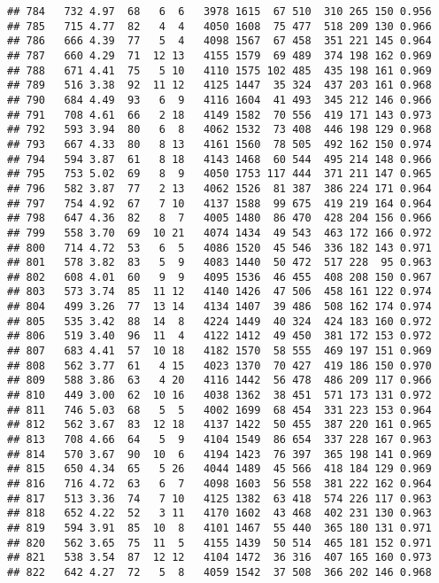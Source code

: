 \documentclass[]{article}
\begin{document}
\begin{verbatim}
## 784   732 4.97  68   6  6   3978 1615  67 510  310 265 150 0.956
## 785   715 4.77  82   4  4   4050 1608  75 477  518 209 130 0.966
## 786   666 4.39  77   5  4   4098 1567  67 458  351 221 145 0.964
## 787   660 4.29  71  12 13   4155 1579  69 489  374 198 162 0.969
## 788   671 4.41  75   5 10   4110 1575 102 485  435 198 161 0.969
## 789   516 3.38  92  11 12   4125 1447  35 324  437 203 161 0.968
## 790   684 4.49  93   6  9   4116 1604  41 493  345 212 146 0.966
## 791   708 4.61  66   2 18   4149 1582  70 556  419 171 143 0.973
## 792   593 3.94  80   6  8   4062 1532  73 408  446 198 129 0.968
## 793   667 4.33  80   8 13   4161 1560  78 505  492 162 150 0.974
## 794   594 3.87  61   8 18   4143 1468  60 544  495 214 148 0.966
## 795   753 5.02  69   8  9   4050 1753 117 444  371 211 147 0.965
## 796   582 3.87  77   2 13   4062 1526  81 387  386 224 171 0.964
## 797   754 4.92  67   7 10   4137 1588  99 675  419 219 164 0.964
## 798   647 4.36  82   8  7   4005 1480  86 470  428 204 156 0.966
## 799   558 3.70  69  10 21   4074 1434  49 543  463 172 166 0.972
## 800   714 4.72  53   6  5   4086 1520  45 546  336 182 143 0.971
## 801   578 3.82  83   5  9   4083 1440  50 472  517 228  95 0.963
## 802   608 4.01  60   9  9   4095 1536  46 455  408 208 150 0.967
## 803   573 3.74  85  11 12   4140 1426  47 506  458 161 122 0.974
## 804   499 3.26  77  13 14   4134 1407  39 486  508 162 174 0.974
## 805   535 3.42  88  14  8   4224 1449  40 324  424 183 160 0.972
## 806   519 3.40  96  11  4   4122 1412  49 450  381 172 153 0.972
## 807   683 4.41  57  10 18   4182 1570  58 555  469 197 151 0.969
## 808   562 3.77  61   4 15   4023 1370  70 427  419 186 150 0.970
## 809   588 3.86  63   4 20   4116 1442  56 478  486 209 117 0.966
## 810   449 3.00  62  10 16   4038 1362  38 451  571 173 131 0.972
## 811   746 5.03  68   5  5   4002 1699  68 454  331 223 153 0.964
## 812   562 3.67  83  12 18   4137 1422  50 455  387 220 161 0.965
## 813   708 4.66  64   5  9   4104 1549  86 654  337 228 167 0.963
## 814   570 3.67  90  10  6   4194 1423  76 397  365 198 141 0.969
## 815   650 4.34  65   5 26   4044 1489  45 566  418 184 129 0.969
## 816   716 4.72  63   6  7   4098 1603  56 558  381 222 162 0.964
## 817   513 3.36  74   7 10   4125 1382  63 418  574 226 117 0.963
## 818   652 4.22  52   3 11   4170 1602  43 468  402 231 130 0.963
## 819   594 3.91  85  10  8   4101 1467  55 440  365 180 131 0.971
## 820   562 3.65  75  11  5   4155 1439  50 514  465 181 152 0.971
## 821   538 3.54  87  12 12   4104 1472  36 316  407 165 160 0.973
## 822   642 4.27  72   5  8   4059 1542  37 508  366 202 146 0.968

\end{verbatim}
\end{document}
